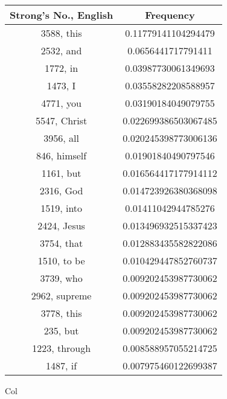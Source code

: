\documentclass[12pt,letterpaper]{article}
\begin{document}
 \begin{longtable}{|c|c|}
\hline
 Strong's No., English & Frequency \\ \hline  
3588, this & 0.11779141104294479\\ \hline 
 2532, and & 0.0656441717791411\\ \hline 
 1772, in & 0.03987730061349693\\ \hline 
 1473, I & 0.03558282208588957\\ \hline 
 4771, you & 0.03190184049079755\\ \hline 
 5547, Christ & 0.022699386503067485\\ \hline 
 3956, all & 0.020245398773006136\\ \hline 
 846, himself & 0.01901840490797546\\ \hline 
 1161, but & 0.016564417177914112\\ \hline 
 2316, God & 0.014723926380368098\\ \hline 
 1519, into & 0.01411042944785276\\ \hline 
 2424, Jesus & 0.013496932515337423\\ \hline 
 3754, that & 0.012883435582822086\\ \hline 
 1510, to be & 0.010429447852760737\\ \hline 
 3739, who & 0.009202453987730062\\ \hline 
 2962, supreme & 0.009202453987730062\\ \hline 
 3778, this & 0.009202453987730062\\ \hline 
 235, but & 0.009202453987730062\\ \hline 
 1223, through & 0.008588957055214725\\ \hline 
 1487, if & 0.007975460122699387\\ \hline 
\end{longtable} 
 

Col
\end{document}

